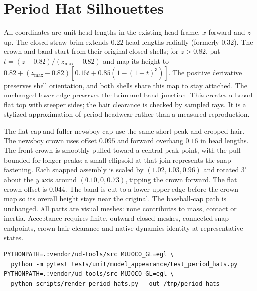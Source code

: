 \section{Period Hat Silhouettes}
All coordinates are unit head lengths in the existing head frame, $x$ forward
and $z$ up. The closed straw brim extends $0.22$ head lengths radially (formerly $0.32$). The crown and band start from
their original closed shells; for $z>0.82$, put
$t=(z-0.82)/(z_{\max}-0.82)$ and map its height to
$0.82+(z_{\max}-0.82)[0.15t+0.85(1-(1-t)^3)]$. The positive derivative
preserves shell orientation, and both shells share this map to stay attached.
The unchanged lower edge preserves the
brim and band junction. This creates a broad flat top with steeper sides; the
hair clearance is checked by sampled rays. It is a stylized approximation of
period headwear rather than a measured reproduction.

The flat cap and fuller newsboy cap use the same short peak and cropped hair.
The newsboy crown uses offset $0.095$ and forward overhang $0.16$ in head
lengths. The front crown is smoothly pulled toward a central peak point, with the
pull bounded for longer peaks; a small ellipsoid at that join represents the
snap fastening. Each snapped assembly is scaled by $(1.02,1.03,0.96)$ and rotated
$3^\circ$ about the $y$ axis around $(0.10,0,0.73)$, tipping the crown forward.
The flat crown offset is $0.044$. The band is cut to a lower upper edge before the crown map
so its overall height stays near the original. The baseball-cap path is unchanged. All
parts are visual meshes: none contributes to mass, contact or inertia.
Acceptance requires finite, outward closed meshes, connected snap endpoints,
crown hair clearance and native dynamics identity at representative states.
\begin{verbatim}
PYTHONPATH=.:vendor/ud-tools/src MUJOCO_GL=egl \
  python -m pytest tests/unit/model_appearance/test_period_hats.py
PYTHONPATH=.:vendor/ud-tools/src MUJOCO_GL=egl \
  python scripts/render_period_hats.py --out /tmp/period-hats
\end{verbatim}
